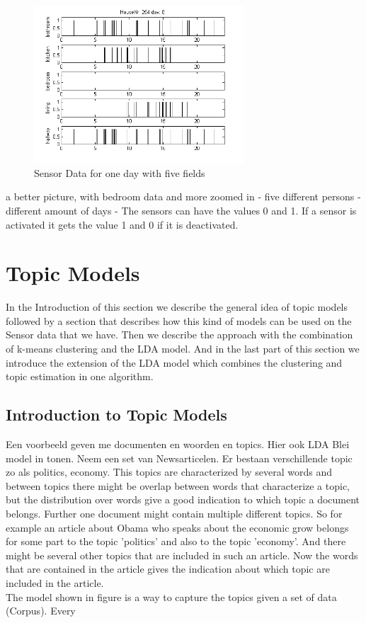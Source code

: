 \documentclass[11pt,a4paper]{article}
\begin{document}
\begin{figure}[h!]
  \centering
    	\includegraphics[width=0.7\textwidth]{Pictures/plainDataExample.png}
    \caption{Sensor Data for one day with five fields}
    \label{fig:PlaineSensorData}
\end{figure}
a better picture, with bedroom data and more zoomed in
- five different persons
- different amount of days
- The sensors can have the values 0 and 1. If a sensor is activated it gets the value 1 and 0 if it is deactivated.
\pagebreak
\section{Topic Models}
In the Introduction of this section we describe the general idea of topic models followed by a section that describes how this kind of models can be used on the Sensor data that we have. Then we describe the approach with the combination of k-means clustering and the LDA model. And in the last part of this section we introduce the extension of the LDA model which combines the clustering and topic estimation in one algorithm.

\subsection{Introduction to Topic Models}
Een voorbeeld geven me documenten en woorden en topics. Hier ook LDA Blei model in tonen.
Neem een set van Newsarticelen. Er bestaan verschillende topic zo als politics, economy. This topics are characterized by several words and between topics there might be overlap between words that characterize a topic, but the distribution over words give a good indication to which topic a document belongs. Further one document might contain multiple different topics. So for example an article about Obama who speaks about the economic grow belongs for some part to the topic 'politics' and also to the topic 'economy'. And there might be several other topics that are included in such an article. Now the words that are contained in the article gives the indication about which topic are included in the article.\\
The model shown in figure is a way to capture the topics given a set of data (Corpus). Every  
\end{document}
